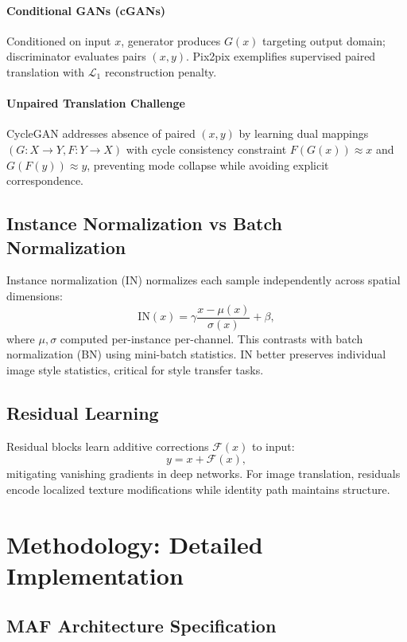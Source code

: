 \documentclass[conference]{IEEEtran}
\begin{document}
\paragraph{Conditional GANs (cGANs)} Conditioned on input $x$, generator produces $G(x)$ targeting output domain; discriminator evaluates pairs $(x, y)$. Pix2pix exemplifies supervised paired translation with $\mathcal{L}_1$ reconstruction penalty.

\paragraph{Unpaired Translation Challenge} CycleGAN addresses absence of paired $(x,y)$ by learning dual mappings $(G: X \to Y, F: Y \to X)$ with cycle consistency constraint $F(G(x)) \approx x$ and $G(F(y)) \approx y$, preventing mode collapse while avoiding explicit correspondence.

\subsection{Instance Normalization vs Batch Normalization}
Instance normalization (IN) normalizes each sample independently across spatial dimensions:
\begin{equation}
\text{IN}(x) = \gamma \frac{x - \mu(x)}{\sigma(x)} + \beta,
\end{equation}
where $\mu, \sigma$ computed per-instance per-channel. This contrasts with batch normalization (BN) using mini-batch statistics. IN better preserves individual image style statistics, critical for style transfer tasks.

\subsection{Residual Learning}
Residual blocks learn additive corrections $\mathcal{F}(x)$ to input:
\begin{equation}
y = x + \mathcal{F}(x),
\end{equation}
mitigating vanishing gradients in deep networks. For image translation, residuals encode localized texture modifications while identity path maintains structure.

\section{Methodology: Detailed Implementation}
\subsection{MAF Architecture Specification}
\end{document}
